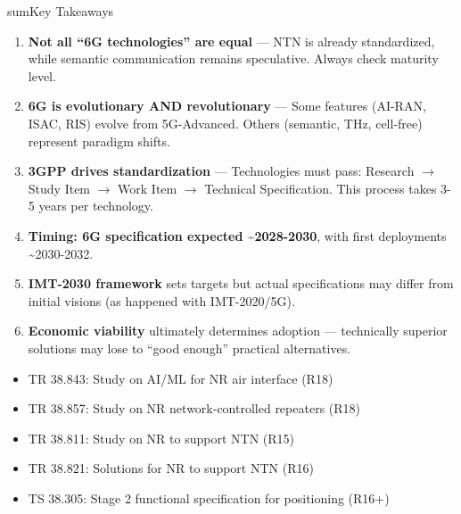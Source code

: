 \begin{CNbox}[unbreakable]{sum}{Key Takeaways}

\begin{enumerate}
\def\labelenumi{\arabic{enumi}.}
\item
  \textbf{Not all ``6G technologies'' are equal} — NTN is already standardized, while semantic communication remains speculative. Always check maturity level.
\item
  \textbf{6G is evolutionary AND revolutionary} — Some features (AI-RAN, ISAC, RIS) evolve from 5G-Advanced. Others (semantic, THz, cell-free) represent paradigm shifts.
\item
  \textbf{3GPP drives standardization} — Technologies must pass: Research \ensuremath{\to} Study Item \ensuremath{\to} Work Item \ensuremath{\to} Technical Specification. This process takes 3-5 years per technology.
\item
  \textbf{Timing: 6G specification expected \textasciitilde{}2028-2030}, with first deployments \textasciitilde{}2030-2032.
\item
  \textbf{IMT-2030 framework} sets targets but actual specifications may differ from initial visions (as happened with IMT-2020/\allowbreak{}5G).
\item
  \textbf{Economic viability} ultimately determines adoption — technically superior solutions may lose to ``good enough'' practical alternatives.
\end{enumerate}

\end{CNbox}



\CNchained{}

\begin{itemize}
\tightlist
\item
  TR 38.843: Study on AI/\allowbreak{}ML for NR air interface (R18)
\item
  TR 38.857: Study on NR network-controlled repeaters (R18)
\item
  TR 38.811: Study on NR to support NTN (R15)
\item
  TR 38.821: Solutions for NR to support NTN (R16)
\item
  TS 38.305: Stage 2 functional specification for positioning (R16+)
\end{itemize}



